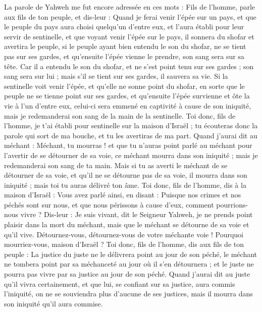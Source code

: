 \begin{multicols}{2}
\VerseOne{}La parole de Yahweh me fut encore adressée en ces mots :
Fils de l'homme, parle aux fils de ton peuple, et dis-leur : Quand je ferai venir l'épée sur un pays, et que le peuple du pays aura choisi quelqu'un d'entre eux, et l'aura établi pour leur servir de sentinelle,
et que voyant venir l'épée sur le pays, il sonnera du shofar et avertira le peuple,
si le peuple ayant bien entendu le son du shofar, ne se tient pas sur ses gardes, et qu'ensuite l'épée vienne le prendre, son sang sera sur sa tête.
Car il a entendu le son du shofar, et ne s'est point tenu sur ses gardes ; son sang sera sur lui ; mais s'il se tient sur ses gardes, il sauvera sa vie.
Si la sentinelle voit venir l'épée, et qu'elle ne sonne point du shofar, en sorte que le peuple ne se tienne point sur ses gardes, et qu'ensuite l'épée survienne et ôte la vie à l'un d'entre eux, celui-ci sera emmené en captivité à cause de son iniquité, mais je redemanderai son sang de la main de la sentinelle.
Toi donc, fils de l'homme, je t'ai établi pour sentinelle sur la maison d'Israël ; tu écouteras donc la parole qui sort de ma bouche, et tu les avertiras de ma part.
Quand j'aurai dit au méchant : Méchant, tu mourras ! et que tu n'auras point parlé au méchant pour l'avertir de se détourner de sa voie, ce méchant mourra dans son iniquité ; mais je redemanderai son sang de ta main.
Mais si tu as averti le méchant de se détourner de sa voie, et qu'il ne se détourne pas de sa voie, il mourra dans son iniquité ; mais toi tu auras délivré ton âme.
Toi donc, fils de l'homme, dis à la maison d'Israël : Vous avez parlé ainsi, en disant : Puisque nos crimes et nos péchés sont sur nous, et que nous périssons à cause d'eux, comment pourrions-nous vivre ?
Dis-leur : Je suis vivant, dit le Seigneur Yahweh, je ne prends point plaisir dans la mort du méchant, mais que le méchant se détourne de sa voie et qu'il vive. Détournez-vous, détournez-vous de votre méchante voie ! Pourquoi mourriez-vous, maison d'Israël ?
Toi donc, fils de l'homme, dis aux fils de ton peuple : La justice du juste ne le délivrera point au jour de son péché, le méchant ne tombera point par sa méchanceté au jour où il s'en détournera ; et le juste ne pourra pas vivre par sa justice au jour de son péché.
Quand j'aurai dit au juste qu'il vivra certainement, et que lui, se confiant sur sa justice, aura commis l'iniquité, on ne se souviendra plus d'aucune de ses justices, mais il mourra dans son iniquité qu'il aura commise.

\end{multicols}
